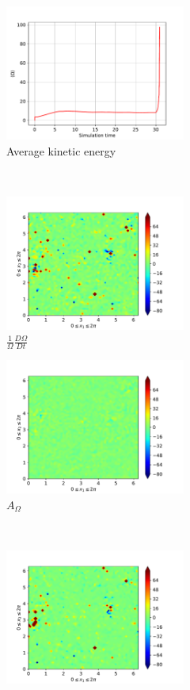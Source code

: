 \begin{figure}[H]
    \begin{subfigure}[H]{0.45\textwidth}
        \includegraphics[height=1.75in]{media/run-cds-65/enst-average1440}
        \caption{Average kinetic energy}
    \end{subfigure}
    ~
    \begin{subfigure}[H]{0.45\textwidth}
        \includegraphics[height=1.75in]{media/run-cds-65/enst-1440}
        \caption{$\frac{1}{\Omega} \frac{D \Omega}{Dt}$}
    \end{subfigure}
    \newline
    \begin{subfigure}{0.45\textwidth}
        \includegraphics[height=1.75in]{media/run-cds-65/A-enst-1440}
        \caption{$A_{\Omega}$}
    \end{subfigure}
    ~
    \begin{subfigure}{0.45\textwidth}
        \includegraphics[height=1.75in]{media/run-cds-65/Pi-enst-1440}

\end{subfigure}
\end{figure}
